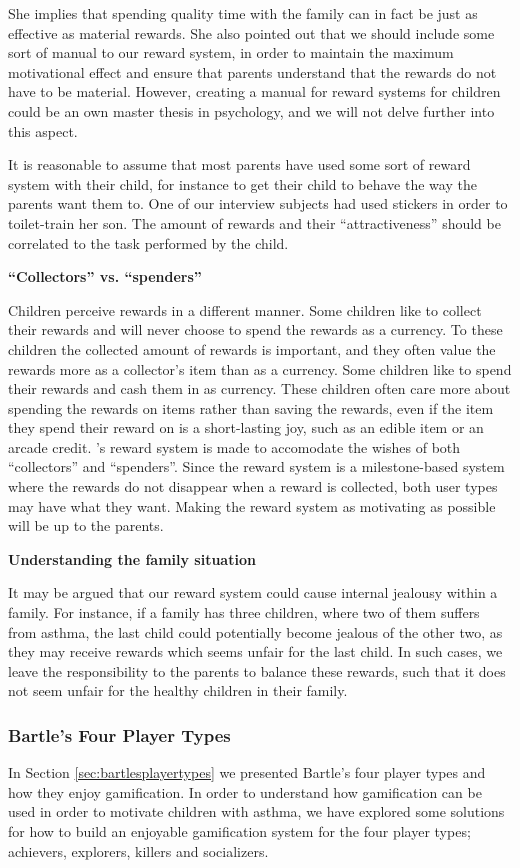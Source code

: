 She implies that spending quality time with the family can in fact be just as effective as material rewards. She also pointed out that we should include some sort of manual to our reward system, in order to maintain the maximum motivational effect and ensure that parents understand that the rewards do not have to be material. However, creating a manual for reward systems for children could be an own master thesis in psychology, and we will not delve further into this aspect. 

It is reasonable to assume that most parents have used some sort of reward system with their child, for instance to get their child to behave the way the parents want them to. One of our interview subjects had used stickers in order to toilet-train her son. The amount of rewards and their ``attractiveness'' should be correlated to the task performed by the child.

\textbf{``Collectors'' vs. ``spenders''}

Children perceive rewards in a different manner. Some children like to collect their rewards and will never choose to spend the rewards as a currency. To these children the collected amount of rewards is important, and they often value the rewards more as a collector's item than as a currency. 
Some children like to spend their rewards and cash them in as currency. These children often care more about spending the rewards on items rather than saving the rewards, even if the item they spend their reward on is a short-lasting joy, such as an edible item or an arcade credit.
\app{}'s reward system is made to accomodate the wishes of both ``collectors'' and ``spenders''. Since the reward system is a milestone-based system where the rewards do not disappear when a reward is collected, both user types may have what they want. Making the reward system as motivating as possible will be up to the parents.

\textbf{Understanding the family situation}

It may be argued that our reward system could cause internal jealousy within a family. For instance, if a family has three children, where two of them suffers from asthma, the last child could potentially become jealous of the other two, as they may receive rewards which seems unfair for the last child. In such cases, we leave the responsibility to the parents to balance these rewards, such that it does not seem unfair for the healthy children in their family.    

\subsubsection{Bartle's Four Player Types}
\label{sec:bartlesfourplayertypes}
In Section \ref{sec:bartlesplayertypes} we presented Bartle's four player types and how they enjoy gamification. In order to understand how gamification can be used in order to motivate children with asthma, we have explored some solutions for how to build an enjoyable gamification system for the four player types; achievers, explorers, killers and socializers. 


